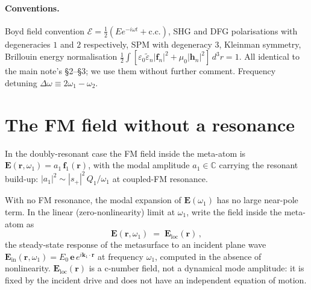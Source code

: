 \documentclass[11pt,a4paper]{article}
\newcommand{\eps}{\varepsilon}
\newcommand{\epstilde}{\widetilde{\varepsilon}}
\newcommand{\bvec}[1]{\mathbf{#1}}
\newcommand{\E}{\bvec{E}}
\newcommand{\f}{\bvec{f}}
\newcommand{\h}{\bvec{h}}
\newcommand{\ri}{\bvec{r}}
\newcommand{\dthreer}{\,d^{3}r}
\newcommand{\Dom}{\Delta\omega}
\newcommand{\Einc}{\E_{\text{loc}}}
\begin{document}
\paragraph{Conventions.}
Boyd field convention $\mathcal{E}=\tfrac12(E e^{-i\omega t}+\text{c.c.})$,
SHG and DFG polarisations with degeneracies $1$ and $2$ respectively, SPM
with degeneracy $3$, Kleinman symmetry, Brillouin energy normalisation
$\tfrac12\!\int[\eps_0\epstilde_n|\f_n|^{2}+\mu_0|\h_n|^{2}]\dthreer=1$.
All identical to the main note's \S 2--\S 3; we use them without further
comment.  Frequency detuning $\Dom\equiv 2\omega_1-\omega_2$.

\section{The FM field without a resonance}\label{sec:Eloc}

In the doubly-resonant case the FM field inside the meta-atom is
$\E(\ri,\omega_1)=a_1\,\f_1(\ri)$, with the modal amplitude $a_1\in
\mathbb{C}$ carrying the resonant build-up:
$|a_1|^{2}\sim |s_+|^{2}\,Q_1/\omega_1$ at coupled-FM resonance.

With no FM resonance, the modal expansion of $\E(\omega_1)$ has no large
near-pole term.  In the linear (zero-nonlinearity) limit at $\omega_1$,
write the field inside the meta-atom as
\begin{equation}
  \E(\ri,\omega_1)\;=\;\Einc(\ri)\,,
  \label{eq:Eloc-def}
\end{equation}
the steady-state response of the metasurface to an incident plane wave
$\E_\text{in}(\ri,\omega_1)=E_0\,\hat{\bm e}\,e^{i\mathbf k_1\!\cdot\ri}$
at frequency $\omega_1$, computed in the absence of nonlinearity.
$\Einc(\ri)$ is a c-number field, not a dynamical mode amplitude: it is
fixed by the incident drive and does not have an independent equation of
motion.
\end{document}
